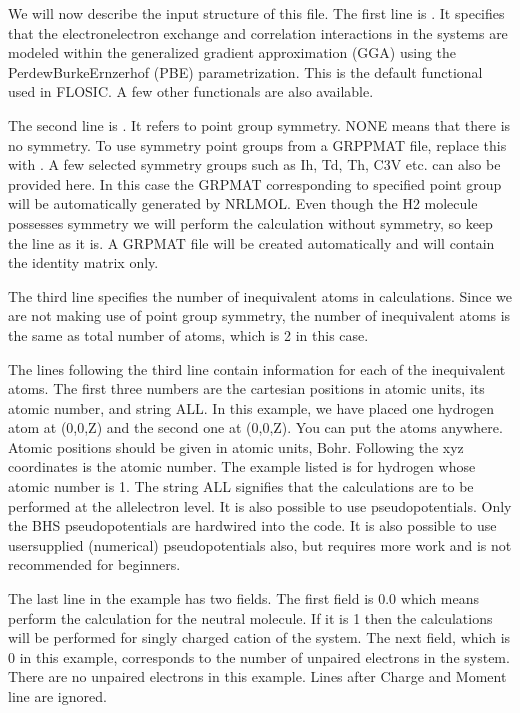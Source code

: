 \documentclass[letterpaper,10pt,english,openany,oneside]{sphinxmanual}
\begin{document}
\sphinxAtStartPar
We will now describe the input structure of this file.
The first line is . It specifies that the electron\sphinxhyphen{}electron exchange and correlation interactions in the
systems are modeled within the generalized gradient approximation (GGA) using the Perdew\sphinxhyphen{}Burke\sphinxhyphen{}Ernzerhof
(PBE) parametrization. This is the default functional used in FLOSIC. A few other functionals are also
available.

\sphinxAtStartPar
The second line is . It refers to point group symmetry. NONE means that there is no symmetry.
To use symmetry point groups from a GRPPMAT file, replace this with . A few selected symmetry groups such as Ih, Td, Th, C3V
etc. can also be provided here. In this case the GRPMAT corresponding to specified point group will be
automatically generated by NRLMOL. Even though the H2 molecule possesses symmetry we will perform the
calculation without symmetry, so keep the  line as it is. A GRPMAT file will be created automatically and will contain the
identity matrix only.

\sphinxAtStartPar
The third line specifies the number of inequivalent atoms in calculations. Since we are not making use of point group
symmetry, the number of inequivalent atoms is the same as total number of atoms, which is 2 in this case.

\sphinxAtStartPar
The lines following the third line contain information for each of the inequivalent atoms.
The first three numbers are the cartesian positions in atomic units, its atomic number, and
string ALL. In this example, we have placed one hydrogen atom at (0,0,Z) and the second one at (0,0,\sphinxhyphen{}Z).
You can put the atoms anywhere. Atomic positions should be given in atomic units, Bohr.
Following the xyz coordinates is the atomic number. The example listed is for hydrogen
whose atomic number is 1. The string ALL signifies that the calculations are to be performed
at the all\sphinxhyphen{}electron level. It is also possible to use pseudopotentials. Only the BHS pseudopotentials
are hardwired into the code. It is also possible to use user\sphinxhyphen{}supplied (numerical) pseudopotentials also, but
requires more work and is not recommended for beginners.

\sphinxAtStartPar
The last line in the example has two fields. The first field is 0.0 which means perform the calculation
for the neutral molecule. If it is 1 then the calculations will be performed for singly charged
cation of the system. The next field, which is 0 in this example, corresponds to the number of unpaired
electrons in the system. There are no unpaired electrons in this example.
Lines after Charge and Moment line are ignored.
\end{document}
